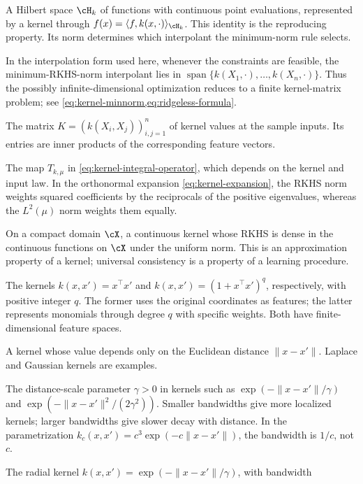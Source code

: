 \documentclass[11pt,twoside]{article}
\theoremstyle{definition}
\theoremstyle{remark}
\begin{document}
\begin{description}[style=nextline,leftmargin=1.5em,labelindent=0pt]
\item[Reproducing kernel Hilbert space (RKHS)]
A Hilbert space $\cH_k$ of functions with continuous point evaluations,
represented by a kernel through
$f(x)=\langle f,k(x,\cdot)\rangle_{\cH_k}$.
This identity is the reproducing property.
Its norm determines which interpolant the minimum-norm rule selects.
\item[Representer theorem]
In the interpolation form used here, whenever the constraints are feasible,
the minimum-RKHS-norm interpolant lies in
$\operatorname{span}\{k(X_1,\cdot),\ldots,k(X_n,\cdot)\}$.
Thus the possibly infinite-dimensional optimization reduces to a finite
kernel-matrix problem; see \cref{eq:kernel-minnorm,eq:ridgeless-formula}.
\item[Kernel Gram matrix]
The matrix $K=(k(X_i,X_j))_{i,j=1}^n$ of kernel values at the sample
inputs. Its entries are inner products of the corresponding feature vectors.
\item[Kernel integral operator]
The map $T_{k,\mu}$ in \cref{eq:kernel-integral-operator}, which depends
on the kernel and input law. In the orthonormal expansion
\cref{eq:kernel-expansion}, the RKHS norm weights squared coefficients
by the reciprocals of the positive eigenvalues, whereas the $L^2(\mu)$
norm weights them equally.
\item[Universal kernel]
On a compact domain $\cX$, a continuous kernel whose RKHS is dense in the
continuous functions on $\cX$ under the uniform norm. This is an
approximation property of a kernel; universal consistency is a property of
a learning procedure.
\item[Linear and polynomial kernels]
The kernels $k(x,x')=x^\top x'$ and $k(x,x')=(1+x^\top x')^q$,
respectively, with positive integer $q$. The former uses the original
coordinates as features; the latter represents monomials through degree
$q$ with specific weights. Both have finite-dimensional feature spaces.
\item[Radial kernel]
A kernel whose value depends only on the Euclidean distance
$\|x-x'\|$. Laplace and Gaussian kernels are examples.
\item[Bandwidth (length scale)]
The distance-scale parameter $\gamma>0$ in kernels such as
$\exp(-\|x-x'\|/\gamma)$ and $\exp(-\|x-x'\|^2/(2\gamma^2))$.
Smaller bandwidths give more localized kernels; larger bandwidths give
slower decay with distance. In the parametrization
$k_c(x,x')=c^3\exp(-c\|x-x'\|)$, the bandwidth is $1/c$, not $c$.
\item[Laplace kernel]
The radial kernel $k(x,x')=\exp(-\|x-x'\|/\gamma)$, with bandwidth

\end{description}
\end{document}
